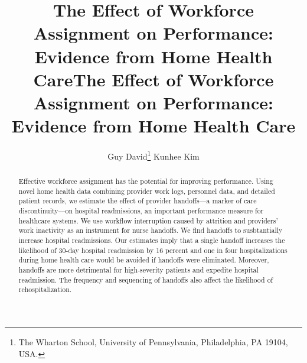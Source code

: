 \documentclass[final,12pt, notitlepage]{article}
\title{The Effect of Workforce Assignment on Performance: Evidence from Home Health Care}
\author{Guy David\thanks{The Wharton School, University of Pennsylvania, Philadelphia, PA 19104, USA.} \quad \quad Kunhee Kim\footnotemark[1]}
\title{The Effect of Workforce Assignment on Performance: Evidence from Home Health Care}
\date{\parbox{\linewidth}{\centering%
	February 2018 \hspace*{0cm} \endgraf\medskip
	}}
\begin{document}
\begin{singlespace}
\maketitle
\thispagestyle{empty}


\begin{abstract}
Effective workforce assignment has the potential for improving performance. Using novel home health data combining provider work logs, personnel data, and detailed patient records, we estimate the effect of provider handoffs---a marker of care discontinuity---on hospital readmissions, an important performance measure for healthcare systems. We use workflow interruption caused by attrition and providers' work inactivity as an instrument for nurse handoffs.
We find handoffs to susbtantially increase hospital readmissions. Our estimates imply that a single handoff increases the likelihood of 30-day hospital readmission by 16 percent and one in four hospitalizations during home health care would be avoided if handoffs were eliminated. Moreover, handoffs are more detrimental for high-severity patients and expedite hospital readmission. The frequency and sequencing of handoffs also affect the likelihood of rehospitalization.
\end{abstract}


\end{singlespace}
\end{document}
